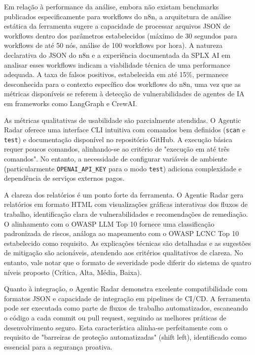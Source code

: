 \documentclass{sftex}
\begin{document}
Em relação à performance da análise, embora não existam benchmarks publicados especificamente para workflows do n8n, a arquitetura de análise estática da ferramenta sugere a capacidade de processar arquivos JSON de workflows dentro dos parâmetros estabelecidos (máximo de 30 segundos para workflows de até 50 nós, análise de 100 workflows por hora). A natureza declarativa do JSON do n8n e a experiência documentada da SPLX AI em analisar esses workflows indicam a viabilidade técnica de uma performance adequada. A taxa de falsos positivos, estabelecida em até 15\%, permanece desconhecida para o contexto específico dos workflows do n8n, uma vez que as métricas disponíveis se referem à detecção de vulnerabilidades de agentes de IA em frameworks como LangGraph e CrewAI.

As métricas qualitativas de usabilidade são parcialmente atendidas. O Agentic Radar oferece uma interface CLI intuitiva com comandos bem definidos (\texttt{scan} e \texttt{test}) e documentação disponível no repositório GitHub. A execução básica requer poucos comandos, alinhando-se ao critério de "execução em até três comandos". No entanto, a necessidade de configurar variáveis de ambiente (particularmente \texttt{OPENAI\_API\_KEY} para o modo \texttt{test}) adiciona complexidade e dependência de serviços externos pagos.

A clareza dos relatórios é um ponto forte da ferramenta. O Agentic Radar gera relatórios em formato HTML com visualizações gráficas interativas dos fluxos de trabalho, identificação clara de vulnerabilidades e recomendações de remediação. O alinhamento com o OWASP LLM Top 10 fornece uma classificação padronizada de riscos, análoga ao mapeamento com o OWASP LCNC Top 10 estabelecido como requisito. As explicações técnicas são detalhadas e as sugestões de mitigação são acionáveis, atendendo aos critérios qualitativos de clareza. No entanto, vale notar que o formato de severidade pode diferir do sistema de quatro níveis proposto (Crítica, Alta, Média, Baixa).

Quanto à integração, o Agentic Radar demonstra excelente compatibilidade com formatos JSON e capacidade de integração em pipelines de CI/CD. A ferramenta pode ser executada como parte de fluxos de trabalho automatizados, escaneando o código a cada commit ou pull request, seguindo as melhores práticas de desenvolvimento seguro. Esta característica alinha-se perfeitamente com o requisito de "barreiras de proteção automatizadas" (shift left), identificado como essencial para a segurança proativa.
\end{document}

